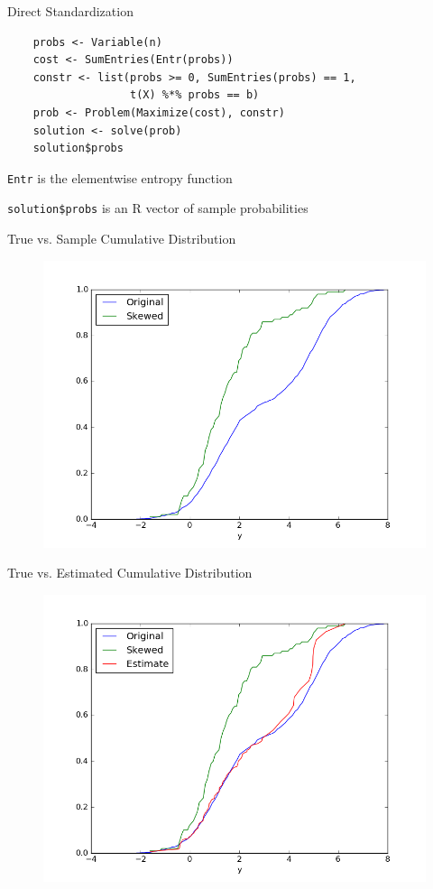 \documentclass{beamer}
\begin{document}
\begin{frame}[fragile]{Direct Standardization}
	\begin{verbatim}
	probs <- Variable(n)
	cost <- SumEntries(Entr(probs))
	constr <- list(probs >= 0, SumEntries(probs) == 1, 
				   t(X) %*% probs == b)
	prob <- Problem(Maximize(cost), constr)
	solution <- solve(prob)
	solution$probs
	\end{verbatim}
	
	\BIT
		\item \verb|Entr| is the elementwise entropy function
		\item \verb|solution$probs| is an R vector of sample probabilities
	\EIT
\end{frame}

\begin{frame}{True vs. Sample Cumulative Distribution}
	\vfill
	\begin{figure}
		\includegraphics[width=1\textwidth]{figs/dstand1.png}
	\end{figure}
	\vfill
\end{frame}

\begin{frame}{True vs. Estimated Cumulative Distribution}
	\vfill
	\begin{figure}
		\includegraphics[width=1\textwidth]{figs/dstand2.png}
	\end{figure}
	\vfill
\end{frame}
\end{document}
